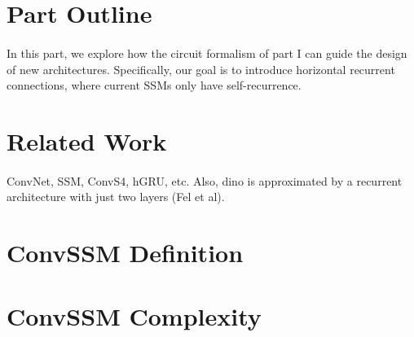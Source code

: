 \documentclass{article}
\begin{document}
\section*{Part Outline}

\paragraph{}In this part, we explore how the circuit formalism of part I can guide the design of new architectures. Specifically, our goal is to introduce horizontal recurrent connections, where current SSMs only have self-recurrence.

\section{Related Work}

\paragraph{}ConvNet, SSM, ConvS4, hGRU, etc. Also, dino is approximated by a recurrent architecture with just two layers (Fel et al).

\section{ConvSSM Definition}
\label{sec:ConvSSM_definition}



\section{ConvSSM Complexity}
\label{sec:ConvSSM_complexity}



\end{document}

